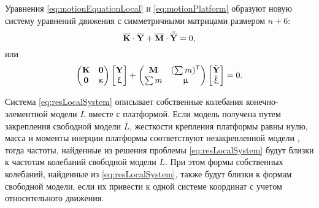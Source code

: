 Уравнения \eqref{eq:motionEquationLocal} и \eqref{eq:motionPlatform} образуют новую систему уравнений движения с симметричными матрицами размером $ n + 6 $:
\begin{equation}
	\overline{\mathbf{K}} \cdot \overline{\mathbf{Y}} + \overline{\mathbf{M}} \cdot \ddot{\overline{\mathbf{Y}}} = 0,
\end{equation}
или
\begin{equation}
	\begin{pmatrix}
	\mathbf{K} & \mathbf{0} \\
	\mathbf{0} & \upkappa
	\end{pmatrix}
	\begin{bmatrix}
	\mathbf{Y} \\
	\upxi
	\end{bmatrix}
	+
	\begin{pmatrix}
	\mathbf{M} & (\sum m) ^ \mathsf{T} \\
	\sum m & \upmu
	\end{pmatrix}
	\begin{bmatrix}
	\ddot{\mathbf{Y}} \\
	\ddot{\upxi}
	\end{bmatrix} = 0.
	\label{eq:resLocalSystem}
\end{equation}

Система \eqref{eq:resLocalSystem} описывает собственные колебания конечно-элементной модели $ L $ вместе с платформой. Если модель  получена путем закрепления свободной модели $ \overline{L} $, жесткости крепления платформы равны нулю, масса и моменты инерции платформы соответствуют незакрепленной модели , тогда частоты, найденные из решения проблемы \eqref{eq:resLocalSystem}  будут близки к частотам  колебаний свободной модели $ \overline{L} $. При этом формы собственных колебаний, найденные из \eqref{eq:resLocalSystem}, также будут близки к формам свободной модели, если их привести к одной системе координат с учетом относительного движения.

